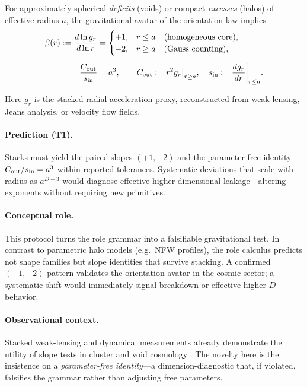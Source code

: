 \documentclass[12pt,a4paper,oneside]{scrreprt}
\begin{document}
For approximately spherical \emph{deficits} (voids) or compact \emph{excesses} 
(halos) of effective radius $a$, the gravitational avatar of the orientation law implies
\begin{align}
\beta(r) := \frac{d\ln g_r}{d\ln r} &= 
\begin{cases}
+1, & r \le a \quad \text{(homogeneous core)},\\
-2, & r \ge a \quad \text{(Gauss counting)},
\end{cases}\\[0.5em]
\frac{C_{\rm out}}{s_{\rm in}} &= a^{3},\qquad 
C_{\rm out} := r^2 g_r\big|_{r\ge a},\quad 
s_{\rm in} := \frac{dg_r}{dr}\bigg|_{r\le a}.
\end{align}

Here $g_r$ is the stacked radial acceleration proxy, reconstructed from 
weak lensing, Jeans analysis, or velocity flow fields. 

\paragraph{Prediction (T1).} 
Stacks must yield the paired slopes $(+1,-2)$ and the parameter-free identity 
$C_{\rm out}/s_{\rm in} = a^3$ within reported tolerances. 
Systematic deviations that scale with radius as $a^{D-3}$ would diagnose 
effective higher-dimensional leakage—altering exponents without requiring 
new primitives.

\paragraph{Conceptual role.} 
This protocol turns the role grammar into a falsifiable gravitational test. 
In contrast to parametric halo models (e.g.\ NFW profiles), the role calculus 
predicts not shape families but slope identities that survive stacking. 
A confirmed $(+1,-2)$ pattern validates the orientation avatar in the cosmic sector; 
a systematic shift would immediately signal breakdown or effective higher-$D$ 
behavior. 

\paragraph{Observational context.} 
Stacked weak-lensing and dynamical measurements already demonstrate the 
utility of slope tests in cluster and void cosmology 
\citep{Sheldon2004WeakLensing,Clampitt2015Voids}. 
The novelty here is the insistence on a \emph{parameter-free identity}—a 
dimension-diagnostic that, if violated, falsifies the grammar rather than 
adjusting free parameters.
\end{document}
